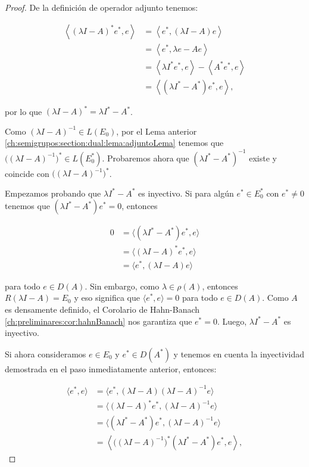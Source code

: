 \begin{proof}
    De la definición de operador adjunto tenemos:

    \[
        \begin{aligned}
            \left\langle (\lambda I - A)^* e^*, e \right\rangle
            &= \left\langle e^*, (\lambda I - A)e \right\rangle \\
            &= \left\langle e^*, \lambda e - Ae \right\rangle \\
            &= \left\langle \lambda I^* e^*, e \right\rangle - \left\langle A^* e^*, e \right\rangle \\
            &= \left\langle (\lambda I^* - A^*)e^*, e \right\rangle,
        \end{aligned}
    \]

    por lo que $(\lambda I - A)^* = \lambda I^* - A^*$.

    Como $(\lambda I - A)^{-1} \in L(E_0)$, por el Lema anterior \ref{ch:semigrupos:section:dual:lema:adjuntoLema} tenemos que $\big((\lambda I - A)^{-1}\big)^* \in L(E_0^*)$. Probaremos ahora que $(\lambda I^* - A^*)^{-1}$ existe y coincide con $\big((\lambda I - A)^{-1}\big)^*$.

    Empezamos probando que $\lambda I^* - A^*$ es inyectivo. Si para algún $e^* \in E_0^*$ con $e^* \neq 0$ tenemos que  $(\lambda I^* - A^*)e^* = 0$, entonces

    \begin{align*}
        0 &= \langle (\lambda I^* - A^*)e^*, e \rangle\\
        &= \langle (\lambda I - A)^* e^*, e \rangle\\
        &= \langle e^*, (\lambda I - A)e \rangle
    \end{align*}

    para todo $e \in D(A)$. Sin embargo, como $\lambda \in \rho(A)$, entonces $R(\lambda I - A) = E_0$ y eso significa que $\langle e^*, e \rangle = 0$ para todo $e \in D(A)$. Como $A$ es densamente definido, el Corolario de Hahn-Banach \ref{ch:preliminares:cor:hahnBanach} nos garantiza que $e^* = 0$. Luego, $\lambda I^* - A^*$ es inyectivo.

    Si ahora consideramos $e \in E_0$ y $e^* \in D(A^*)$ y tenemos en cuenta la inyectividad demostrada en el paso inmediatamente anterior, entonces:

    \begin{align*}
        \langle e^*, e \rangle &= \langle e^*, (\lambda I - A)(\lambda I - A)^{-1} e \rangle\\
        &= \langle (\lambda I - A)^* e^*, (\lambda I - A)^{-1}e \rangle\\
        &= \langle (\lambda I^* - A^*)e^*, (\lambda I - A)^{-1}e \rangle\\
        &= \left \langle \big( (\lambda I - A)^{-1} \big )^*(\lambda I^* - A^*)e^*, e \right \rangle,
    \end{align*}


\end{proof}
